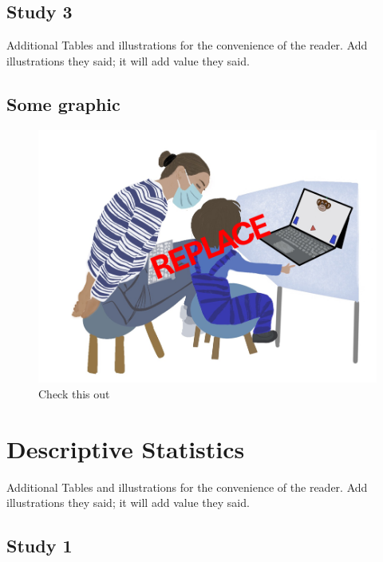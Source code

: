 \documentclass[
  man]{apa6}
\begin{document}
\subsection{Study 3}\label{study-3-1}

Additional Tables and illustrations for the convenience of the reader. Add illustrations they said; it will add value they said.

\subsection{Some graphic}\label{some-graphic-2}

\begin{figure}

{\centering \includegraphics{../illustrations/Symlit_Rep_Setup} 

}

\caption{Check this out}\label{fig:suppl-setup5}
\end{figure}

\section{Descriptive Statistics}\label{descriptive-statistics}

Additional Tables and illustrations for the convenience of the reader. Add illustrations they said; it will add value they said.

\subsection{Study 1}\label{study-1-2}
\end{document}
